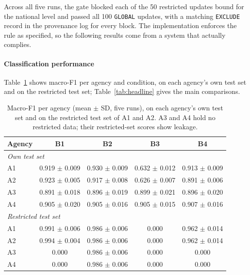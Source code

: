 Across all five runs, the gate blocked each of the 50 restricted updates bound for the national level and passed all 100 \texttt{GLOBAL} updates, with a matching \texttt{EXCLUDE} record in the provenance log for every block. The implementation enforces the rule as specified, so the following results come from a system that actually complies.



\paragraph{Classification performance}

Table~\ref{tab:peragency} shows macro-F1 per agency and condition, on each agency's own test set and on the restricted test set; Table~\ref{tab:headline} gives the main comparisons.

\begin{table}[t]
\centering
\scriptsize
\caption{Macro-F1 per agency (mean $\pm$ SD, five runs), on each agency's own test set and on the restricted test set of A1 and A2. A3 and A4 hold no restricted data; their restricted-set scores show leakage.}
\label{tab:peragency}
\begin{tabular}{lcccc}
\toprule
Agency & B1 & B2 & B3 & B4 \\
\midrule
\multicolumn{5}{l}{\emph{Own test set}} \\
A1 & 0.919 $\pm$ 0.009 & 0.930 $\pm$ 0.009 & 0.632 $\pm$ 0.012 & 0.913 $\pm$ 0.009 \\
A2 & 0.923 $\pm$ 0.005 & 0.917 $\pm$ 0.008 & 0.626 $\pm$ 0.007 & 0.891 $\pm$ 0.006 \\
A3 & 0.891 $\pm$ 0.018 & 0.896 $\pm$ 0.019 & 0.899 $\pm$ 0.021 & 0.896 $\pm$ 0.020 \\
A4 & 0.905 $\pm$ 0.020 & 0.905 $\pm$ 0.016 & 0.905 $\pm$ 0.015 & 0.907 $\pm$ 0.016 \\
\midrule
\multicolumn{5}{l}{\emph{Restricted test set}} \\
A1 & 0.991 $\pm$ 0.006 & 0.986 $\pm$ 0.006 & 0.000 & 0.962 $\pm$ 0.014 \\
A2 & 0.994 $\pm$ 0.004 & 0.986 $\pm$ 0.006 & 0.000 & 0.962 $\pm$ 0.014 \\
A3 & 0.000 & 0.986 $\pm$ 0.006 & 0.000 & 0.000 \\
A4 & 0.000 & 0.986 $\pm$ 0.006 & 0.000 & 0.000 \\
\bottomrule
\end{tabular}
\end{table}


